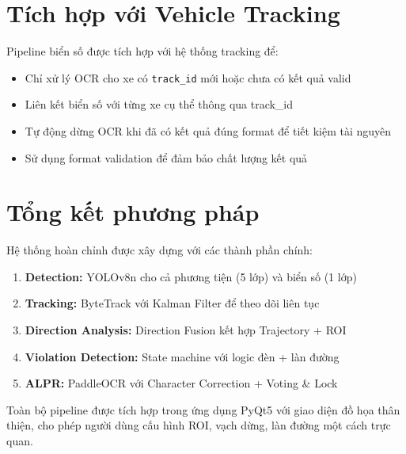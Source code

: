 \section{Tích hợp với Vehicle Tracking}

Pipeline biển số được tích hợp với hệ thống tracking để:
\begin{itemize}
    \item Chỉ xử lý OCR cho xe có \texttt{track\_id} mới hoặc chưa có kết quả valid
    \item Liên kết biển số với từng xe cụ thể thông qua track\_id
    \item Tự động dừng OCR khi đã có kết quả đúng format để tiết kiệm tài nguyên
    \item Sử dụng format validation để đảm bảo chất lượng kết quả
\end{itemize}

\section{Tổng kết phương pháp}

Hệ thống hoàn chỉnh được xây dựng với các thành phần chính:

\begin{enumerate}
    \item \textbf{Detection:} YOLOv8n cho cả phương tiện (5 lớp) và biển số (1 lớp)
    \item \textbf{Tracking:} ByteTrack với Kalman Filter để theo dõi liên tục
    \item \textbf{Direction Analysis:} Direction Fusion kết hợp Trajectory + ROI
    \item \textbf{Violation Detection:} State machine với logic đèn + làn đường
    \item \textbf{ALPR:} PaddleOCR với Character Correction + Voting \& Lock
\end{enumerate}

Toàn bộ pipeline được tích hợp trong ứng dụng PyQt5 với giao diện đồ họa thân thiện, cho phép người dùng cấu hình ROI, vạch dừng, làn đường một cách trực quan.

